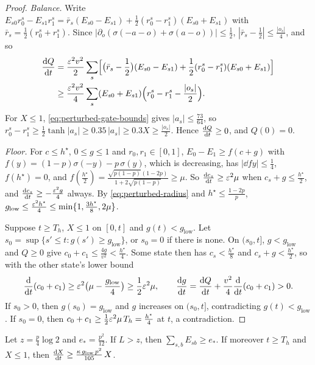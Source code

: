 \begin{proof}
\emph{Balance.} Write $E_{s0}r^s_0-E_{s1}r^s_1=\bar r_s(E_{s0}-E_{s1})+\frac12(r^s_0-r^s_1)(E_{s0}+E_{s1})$ with $\bar r_s=\frac12(r^s_0+r^s_1)$.
Since $|\partial_o(\sigma(-a-o)+\sigma(a-o))|\le\frac12$, $|\bar r_s-\frac12|\le\frac{|o_s|}4$, and so
\[
 \begin{aligned}
 \ddt{Q}&=\frac{\initscale^2v^2}2\sum_s\Bigl[
 \bigl(\bar r_s-\tfrac12\bigr)(E_{s0}-E_{s1})
 +\tfrac12(r^s_0-r^s_1)(E_{s0}+E_{s1})\Bigr]\\
 &\ge\frac{\initscale^2v^2}4\sum_s(E_{s0}+E_{s1})
 \Bigl(r^s_0-r^s_1-\frac{|o_s|}2\Bigr).
 \end{aligned}
\]
For $X\le1$, \cref{eq:perturbed-gate-bounds} gives $|a_s|\le\frac{73}{64}$, so $r^s_0-r^s_1\ge\frac12\tanh|a_s|\ge0.35\,|a_s|\ge0.3X\ge\frac{|o_s|}2$.
Hence $\ddt{Q}\ge0$, and $Q(0)=0$.

\emph{Floor.} For $c\le h^\star$, $0\le g\le1$ and $r_0,r_1\in[0,1]$, $E_0-E_1\ge f(c+g)$ with $f(y)=(1-p)\sigma(-y)-p\,\sigma(y)$, which is
decreasing, has $|\dd{f}{y}|\le\frac14$, $f(h^\star)=0$, and
$f(\frac{h^\star}2)=\frac{\sqrt{p(1-p)}(1-2p)}{1+2\sqrt{p(1-p)}}\ge\mu$. So $\ddt{c_s}\ge\initscale^2\mu$ when $c_s+g\le\frac{h^\star}2$, and
$\ddt{c_s}\ge-\frac{\initscale^2g}4$ always. By \cref{eq:perturbed-radius} and $h^\star\le\frac{1-2p}{p}$,
$g_{\mathrm{low}}\le\frac{\varepsilon^2h^\star}4\le\min\{1,\frac{3h^\star}8,2\mu\}$.

Suppose $t\ge T_h$, $X\le1$ on $[0,t]$ and $g(t)<g_{\mathrm{low}}$. Let $s_0=\sup\{s'\le t:g(s')\ge g_{\mathrm{low}}\}$, or $s_0=0$ if there is none.
On $(s_0,t]$, $g<g_{\mathrm{low}}$ and $Q\ge0$ give $c_0+c_1\le\frac{4g}{v^2}<\frac{h^\star}4$. Some state then has $c_s<\frac{h^\star}8$ and
$c_s+g<\frac{h^\star}2$, so with the other state's lower bound
\[
 \ddt{}(c_0+c_1)\ge\initscale^2\bigl(\mu-\tfrac{g_{\mathrm{low}}}4\bigr)\ge\tfrac12\initscale^2\mu,\qquad
 \ddt{g}=\ddt{Q}+\tfrac{v^2}4\ddt{}(c_0+c_1)>0 .
\]
If $s_0>0$, then $g(s_0)=g_{\mathrm{low}}$ and $g$ increases on $(s_0,t]$, contradicting $g(t)<g_{\mathrm{low}}$. If $s_0=0$, then
$c_0+c_1\ge\frac12\varepsilon^2\mu\,T_h=\frac{h^\star}4$ at $t$, a contradiction.
\end{proof}

\begin{lemma}
\label{lem:perturbed-grow}
Let $z=\frac p4\log2$ and $e_\ast=\frac{p^2}{12}$. If $L>z$, then $\sum_{s,b}E_{sb}\ge e_\ast$. If moreover $t\ge T_h$ and $X\le1$, then
$\ddt{X}\ge\frac{\kappa\,g_{\mathrm{low}}\,p^2}{105}\,X$.
\end{lemma}

